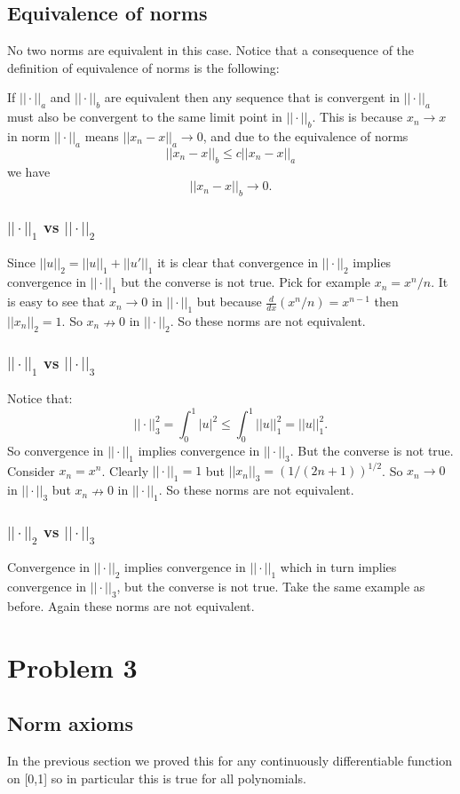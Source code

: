 \documentclass{article}
\begin{document}
\subsection*{Equivalence of norms}
No two norms are equivalent in this case. Notice that a consequence of the definition of
equivalence of norms is the following:

If $||\cdot||_a$ and $||\cdot||_b$ are equivalent then any sequence that is
convergent in $||\cdot||_a$ must also be convergent to the same limit point in
$||\cdot||_b$. This is because $x_n\to x$ in norm $||\cdot||_a$ means
$||x_n-x||_a\to 0$, and due to the equivalence of norms
\[
	||x_n-x||_b\leq c ||x_n-x||_a
\]
we have
\[
	||x_n-x||_b\to 0.
\]
\subsubsection*{$||\cdot||_1$ vs $||\cdot||_2$}
Since $||u||_2=||u||_1+||u'||_1$ it is clear that convergence in $||\cdot||_2$
implies convergence in $||\cdot||_1$ but the converse is not true.
Pick for example $x_n=x^n/n$. It is easy to see that $x_n\to 0$ in
$||\cdot||_1$ but because $\frac{d}{dx}(x^n/n)=x^{n-1}$ then $||x_n||_2=1$.
So $x_n\nrightarrow 0$ in $||\cdot||_2$. So these norms are not equivalent.
\subsubsection*{$||\cdot||_1$ vs $||\cdot||_3$}
Notice that:
\[
||\cdot||_3^2=\int_0^1|u|^2\leq \int_0^1 ||u||_1^2=||u||_1^2.
\]
So convergence in $||\cdot||_1$ implies convergence in $||\cdot||_3$. But the
converse is not true. Consider $x_n=x^n$. Clearly $||\cdot||_1=1$ but
$||x_n||_3=(1/(2n+1))^{1/2}$. So $x_n \to 0$ in $||\cdot||_3$ but
$x_n\nrightarrow 0$ in $||\cdot||_1$. So these norms are not equivalent.
\subsubsection*{$||\cdot||_2$ vs $||\cdot||_3$}
Convergence in $||\cdot||_2$ implies convergence in $||\cdot||_1$ which in turn
implies convergence in $||\cdot||_3$, but the converse is not true. Take the
same example as before. Again these norms are not equivalent.
\section*{Problem 3}
\subsection*{Norm axioms}
In the previous section we proved this for any continuously differentiable
function on [0,1] so in particular this is true for all polynomials.
\end{document}
